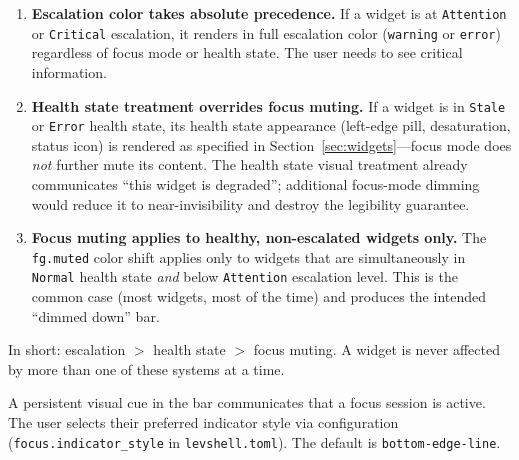 \documentclass[11pt,a4paper]{article}
\begin{document}
\begin{enumerate}[leftmargin=1.5em, itemsep=3pt]
  \item \textbf{Escalation color takes absolute precedence.} If a widget is at \texttt{Attention} or \texttt{Critical} escalation, it renders in full escalation color (\texttt{warning} or \texttt{error}) regardless of focus mode or health state. The user needs to see critical information.

  \item \textbf{Health state treatment overrides focus muting.} If a widget is in \texttt{Stale} or \texttt{Error} health state, its health state appearance (left-edge pill, desaturation, status icon) is rendered as specified in Section~\ref{sec:widgets}---focus mode does \emph{not} further mute its content. The health state visual treatment already communicates ``this widget is degraded''; additional focus-mode dimming would reduce it to near-invisibility and destroy the legibility guarantee.

  \item \textbf{Focus muting applies to healthy, non-escalated widgets only.} The \texttt{fg.muted} color shift applies only to widgets that are simultaneously in \texttt{Normal} health state \emph{and} below \texttt{Attention} escalation level. This is the common case (most widgets, most of the time) and produces the intended ``dimmed down'' bar.
\end{enumerate}

In short: escalation $>$ health state $>$ focus muting. A widget is never affected by more than one of these systems at a time.

A persistent visual cue in the bar communicates that a focus session is active. The user selects their preferred indicator style via configuration (\texttt{focus.indicator\_style} in \texttt{levshell.toml}). The default is \texttt{bottom-edge-line}.
\end{document}
